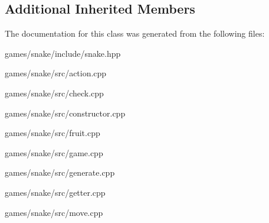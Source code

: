 \subsection*{Additional Inherited Members}


The documentation for this class was generated from the following files\+:\begin{DoxyCompactItemize}
\item 
games/snake/include/snake.\+hpp\item 
games/snake/src/action.\+cpp\item 
games/snake/src/check.\+cpp\item 
games/snake/src/constructor.\+cpp\item 
games/snake/src/fruit.\+cpp\item 
games/snake/src/game.\+cpp\item 
games/snake/src/generate.\+cpp\item 
games/snake/src/getter.\+cpp\item 
games/snake/src/move.\+cpp\end{DoxyCompactItemize}
